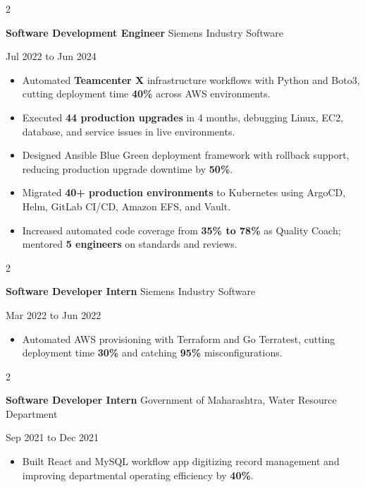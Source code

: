 \documentclass[10pt, letterpaper]{article}
\newenvironment{highlights}{
    \begin{itemize}[
        topsep=0.10 cm,
        parsep=0.06 cm,
        partopsep=0pt,
        itemsep=0.06 cm,
        leftmargin=12pt
    ]
}{
    \end{itemize}
}
\newenvironment{twocolentry}[2][]{
    \onecolentry
    \def\secondColumn{#2}
    \setcolumnwidth{\fill, 4.5 cm}
    \begin{paracol}{2}
}{
    \switchcolumn \raggedleft \secondColumn
    \end{paracol}
    \endonecolentry
}
\begin{document}
\begin{twocolentry}{Jul 2022 to Jun 2024}
\textbf{Software Development Engineer} \textbar{} Siemens Industry Software
\end{twocolentry}
\begin{highlights}
  \item Automated \textbf{Teamcenter X} infrastructure workflows with Python and Boto3, cutting deployment time \textbf{40\%} across AWS environments.
  \item Executed \textbf{44 production upgrades} in 4 months, debugging Linux, EC2, database, and service issues in live environments.
  \item Designed Ansible Blue Green deployment framework with rollback support, reducing production upgrade downtime by \textbf{50\%}.
  \item Migrated \textbf{40+ production environments} to Kubernetes using ArgoCD, Helm, GitLab CI/CD, Amazon EFS, and Vault.
  \item Increased automated code coverage from \textbf{35\% to 78\%} as Quality Coach; mentored \textbf{5 engineers} on standards and reviews.
\end{highlights}

\vspace{0.15 cm}

\begin{twocolentry}{Mar 2022 to Jun 2022}
\textbf{Software Developer Intern} \textbar{} Siemens Industry Software
\end{twocolentry}
\begin{highlights}
  \item Automated AWS provisioning with Terraform and Go Terratest, cutting deployment time \textbf{30\%} and catching \textbf{95\%} misconfigurations.
\end{highlights}

\vspace{0.15 cm}

\begin{twocolentry}{Sep 2021 to Dec 2021}
\textbf{Software Developer Intern} \textbar{} Government of Maharashtra, Water Resource Department
\end{twocolentry}
\begin{highlights}
  \item Built React and MySQL workflow app digitizing record management and improving departmental operating efficiency by \textbf{40\%}.
\end{highlights}
\end{document}

